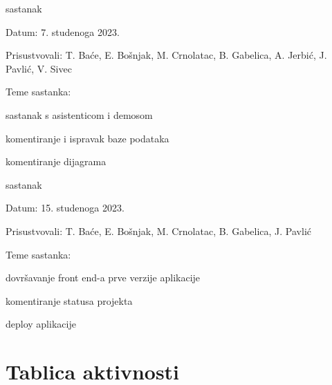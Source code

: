 \begin{packed_enum}
			\item  sastanak
			\item[] \begin{packed_item}
				\item Datum: 7. studenoga 2023.
				\item Prisustvovali: T. Baće, E. Bošnjak, M. Crnolatac, B. Gabelica, A. Jerbić, J. Pavlić, V. Sivec
				\item Teme sastanka:
				\begin{packed_item}
					\item  sastanak s asistenticom i demosom
					\item  komentiranje i ispravak baze podataka
					\item  komentiranje dijagrama
				\end{packed_item}
			\end{packed_item}
			
			\item  sastanak
			\item[] \begin{packed_item}
				\item Datum: 15. studenoga 2023.
				\item Prisustvovali: T. Baće, E. Bošnjak, M. Crnolatac, B. Gabelica, J. Pavlić
				\item Teme sastanka:
				\begin{packed_item}
					\item  dovršavanje front end-a prve verzije aplikacije
					\item  komentiranje statusa projekta
					\item  deploy aplikacije
				\end{packed_item}
			\end{packed_item}
			
		\end{packed_enum}
		
		\eject
		\section*{Tablica aktivnosti}


